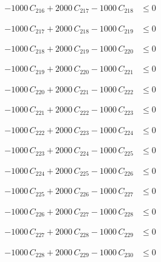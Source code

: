 \documentclass[a4paper,11pt]{article}
\begin{document}
\begin{align}
-1000\,C_{216} + 2000\,C_{217} - 1000\,C_{218} &\leq 0 \nonumber
\end{align}

\begin{align}
-1000\,C_{217} + 2000\,C_{218} - 1000\,C_{219} &\leq 0 \nonumber
\end{align}

\begin{align}
-1000\,C_{218} + 2000\,C_{219} - 1000\,C_{220} &\leq 0 \nonumber
\end{align}

\begin{align}
-1000\,C_{219} + 2000\,C_{220} - 1000\,C_{221} &\leq 0 \nonumber
\end{align}

\begin{align}
-1000\,C_{220} + 2000\,C_{221} - 1000\,C_{222} &\leq 0 \nonumber
\end{align}

\begin{align}
-1000\,C_{221} + 2000\,C_{222} - 1000\,C_{223} &\leq 0 \nonumber
\end{align}

\begin{align}
-1000\,C_{222} + 2000\,C_{223} - 1000\,C_{224} &\leq 0 \nonumber
\end{align}

\begin{align}
-1000\,C_{223} + 2000\,C_{224} - 1000\,C_{225} &\leq 0 \nonumber
\end{align}

\begin{align}
-1000\,C_{224} + 2000\,C_{225} - 1000\,C_{226} &\leq 0 \nonumber
\end{align}

\begin{align}
-1000\,C_{225} + 2000\,C_{226} - 1000\,C_{227} &\leq 0 \nonumber
\end{align}

\begin{align}
-1000\,C_{226} + 2000\,C_{227} - 1000\,C_{228} &\leq 0 \nonumber
\end{align}

\begin{align}
-1000\,C_{227} + 2000\,C_{228} - 1000\,C_{229} &\leq 0 \nonumber
\end{align}

\begin{align}
-1000\,C_{228} + 2000\,C_{229} - 1000\,C_{230} &\leq 0 \nonumber
\end{align}
\end{document}
